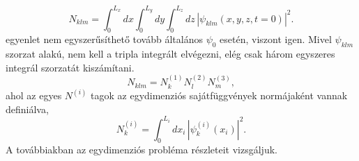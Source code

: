 \begin{equation}
	N_{klm} = \int_0^{L_x}dx\int_0^{L_y}dy\int_0^{L_z}dz\,|\psi_{klm}(x,y,z,t=0)|^2.
	\label{3dbox:3norm}
\end{equation}
 egyenlet nem egyszerűsíthető tovább általános $\psi_0$ esetén, viszont  igen. Mivel $\psi_{klm}$ szorzat alakú, nem kell a tripla integrált elvégezni, elég csak három egyszeres integrál szorzatát kiszámítani.
\begin{equation}
	N_{klm} = N^{(1)}_kN^{(2)}_lN^{(3)}_m,
\end{equation}
ahol az egyes $N^{(i)}$ tagok az egydimenziós sajátfüggvények normájaként vannak definiálva,
\begin{equation}
	N^{(i)}_k = \int_0^{L_i}dx_i\,\left|\psi^{(i)}_k(x_i)\right|^2.
\end{equation}
A továbbiakban az egydimenziós probléma részleteit vizsgáljuk.
